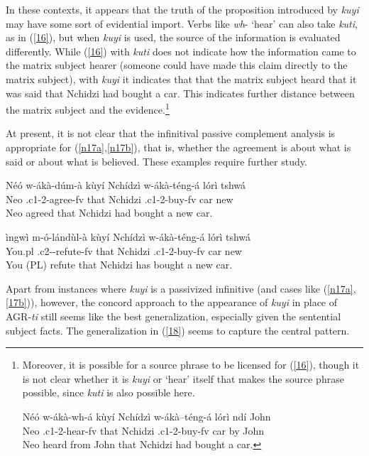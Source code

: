 \documentclass[output=paper,
modfonts
]{langscibook}
\begin{document}
In these contexts, it appears that the truth of the proposition introduced by \textit{kuyi} may have some sort of evidential import. Verbs like \textit{wh}- `hear' can also take \textit{kuti}, as in (\ref{16}), but when \textit{kuyi} is used, the source of the information is evaluated differently. While (\ref{16}) with \textit{kuti} does not indicate how the information came to the matrix subject hearer (someone could have made this claim directly to the matrix subject), with \textit{kuyi} it indicates that that the matrix subject heard that it was said that Nchidzi had bought a car. This indicates further distance between the matrix subject and the evidence.\footnote{Moreover, it is possible for a source phrase to be licensed for (\ref{16}), though it is not clear whether it is \textit{kuyi} or `hear' itself that makes the source phrase possible, since \textit{kuti} is also possible here. 

\ea \gll Néó w-ákà-wh-á kùyí Nchídzì  w-ákà–téng-á lórì ndí  John\\
Neo .c1-2-hear-fv	that Nchidzi .c1-2-buy-fv car by John\\
\glt Neo heard from John that Nchidzi had bought a car. \z 
} 

At present, it is not clear that the infinitival passive complement analysis is appropriate for (\ref{n17a},\ref{n17b}), that is, whether the agreement is about what is said or about what is believed. These examples require further study. 

\ea\label{n17} 
\ea \gll Néó w-ákà-dúm-à kùyí Nchídzì w-ákà-téng-á lórì tshwá \label{n17a}\\
	Neo	.c1-2-agree-fv that  Nchidzi  .c1-2-buy-fv car new\\
	\glt Neo agreed that Nchidzi had bought a new car.

\ex  \gll ìngwì 	m-ó-lándùl-à kùyí Nchídzì  w-ákà-téng-á lórì tshwá \label{n17b}\\
	You.pl .c2--refute-fv that Nchidzi  .c1-2-buy-fv	car new\\
	\glt You (PL) refute that Nchidzi has bought a new car.  \z \z  


Apart from instances where \textit{kuyi} is a passivized infinitive (and cases like (\ref{n17a},\ref{17b})), however, the concord approach to the appearance of \textit{kuyi} in place of AGR-\textit{ti} still seems like the best generalization, especially given the sentential subject facts. The generalization in (\ref{18}) seems to capture the central pattern.
\end{document}
